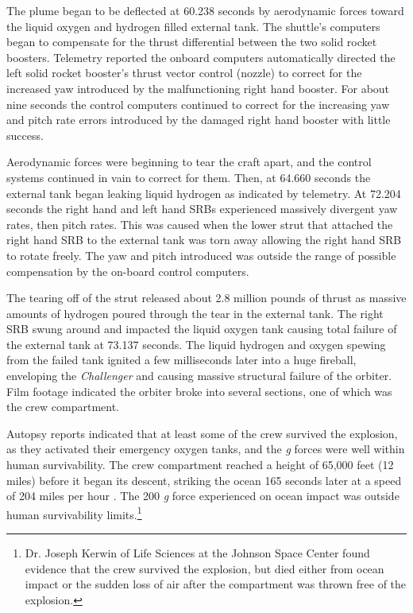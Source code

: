 The plume began to be deflected at 60.238 seconds by aerodynamic forces toward the liquid oxygen and hydrogen filled external tank. The shuttle's computers began to compensate for the thrust differential between the two solid rocket boosters. Telemetry reported the onboard computers automatically directed the left solid rocket booster's thrust vector control (nozzle) to correct for the increased yaw introduced by the malfunctioning right hand booster. For about nine seconds the control computers continued to correct for the increasing yaw and pitch rate errors introduced by the damaged right hand booster with little success.

Aerodynamic forces were beginning to tear the craft apart, and the control systems continued in vain to correct for them. Then, at 64.660 seconds the external tank began leaking liquid hydrogen as indicated by telemetry. At 72.204 seconds the right hand and left hand SRBs experienced massively divergent yaw rates, then pitch rates. This was caused when the lower strut that attached the right hand SRB to the external tank was torn away allowing the right hand SRB to rotate freely. The yaw and pitch introduced was outside the range of possible compensation by the on-board control computers.

The tearing off of the strut released about 2.8 million pounds of thrust as massive amounts of hydrogen poured through the tear in the external tank. The right SRB swung around and impacted the liquid oxygen tank causing total failure of the external tank at 73.137 seconds. The liquid hydrogen and oxygen spewing from the failed tank ignited a few milliseconds later into a huge fireball, enveloping the {\em Challenger} and causing massive structural failure of the orbiter. Film footage indicated the orbiter broke into several sections, one of which was the crew compartment.

Autopsy reports indicated that at least some of the crew survived the explosion, as they activated their emergency oxygen tanks, and the {\em g} forces were well within human survivability. The crew compartment reached a height of 65,000 feet (12 miles) before it began its descent, striking the ocean 165 seconds later at a speed of 204 miles per hour \cite[p. 177]{lewis}. The 200 {\em g} force experienced on ocean impact was outside human survivability limits.\footnote{Dr. Joseph Kerwin of Life Sciences at the Johnson Space Center found evidence that the crew survived the explosion, but died either from ocean impact or the sudden loss of air after the compartment was thrown free of the explosion.}

